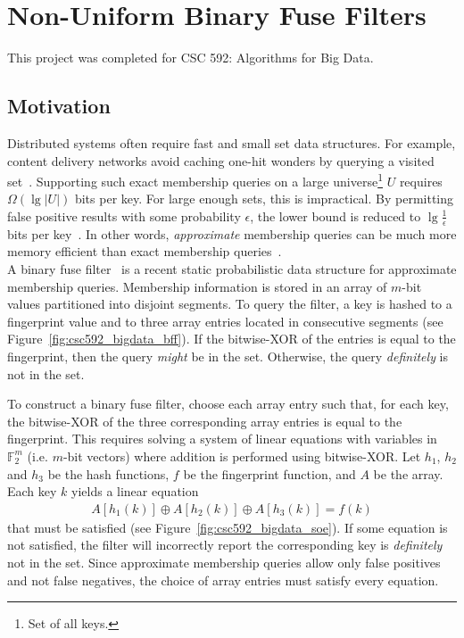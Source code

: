 \section{Non-Uniform Binary Fuse Filters}

This project was completed for CSC 592: Algorithms for Big Data.

\subsection{Motivation}

Distributed systems often require fast and small set data structures. For example, content delivery networks avoid caching one-hit wonders by querying a visited
set~\cite{maggs2015}. Supporting such exact membership queries on a large universe\footnote{Set of all keys.} $U$ requires $\Omega(\lg |U|)$ bits per key. For 
large enough sets, this is impractical. By permitting false positive results with some probability $\epsilon$, the lower bound is reduced to 
$\lg \frac{1}{\epsilon}$ bits per key~\cite{carter1978}. In other words, \textit{approximate} membership queries can be much more memory efficient than exact 
membership queries~\cite{bloom1970, graf2020, graf2022}. \\

\noindent
A binary fuse filter~\cite{graf2022} is a recent static probabilistic data structure for approximate membership queries. Membership information is stored in an 
array of $m$-bit values partitioned into disjoint segments. To query the filter, a key is hashed to a fingerprint value and to three array entries located in 
consecutive segments (see Figure~\ref{fig:csc592_bigdata_bff}). If the bitwise-XOR of the entries is equal to the fingerprint, then the query \emph{might} be in 
the set. Otherwise, the query \emph{definitely} is not in the set.



\noindent
To construct a binary fuse filter, choose each array entry such that, for each key, the bitwise-XOR of the three corresponding array entries is equal to
the fingerprint. This requires solving a system of linear equations with variables in $\mathbb{F}^{m}_2$ (i.e. $m$-bit vectors) where addition is performed 
using bitwise-XOR. Let $h_1$, $h_2$ and $h_3$ be the hash functions, $f$ be the fingerprint function, and $A$ be the array. Each key $k$ yields a linear 
equation
\begin{align*}
    A[h_1(k)] \oplus A[h_2(k)] \oplus A[h_3(k)] = f(k)
\end{align*}
that must be satisfied (see Figure~\ref{fig:csc592_bigdata_soe}). If some equation is not satisfied, the filter will incorrectly report the corresponding key is
\emph{definitely} not in the set. Since approximate membership queries allow only false positives and not false negatives, the choice of array entries must 
satisfy every equation.

